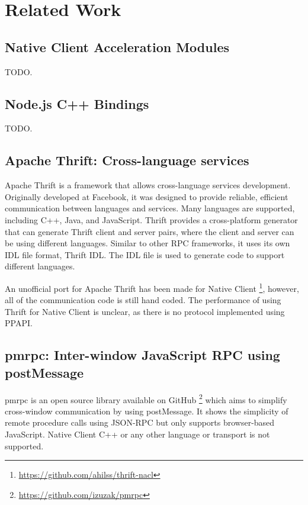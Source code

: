 \chapter{Related Work} 
\label{Chapter3} 

\section{Native Client Acceleration Modules} %
\label{sec:naclam}
TODO.

\section{Node.js C++ Bindings} %
\label{sec:node_js_c_bindings}
TODO.



\section{Apache Thrift: Cross-language services} %
\label{sec:apache_thrift_cross_language_services}
Apache Thrift is a framework that allows cross-language services development. Originally developed at Facebook, it was designed to provide reliable, efficient communication between languages and services. Many languages are supported, including C++, Java, and JavaScript. Thrift provides a cross-platform generator that can generate Thrift client and server pairs, where the client and server can be using different languages. Similar to other RPC frameworks, it uses its own IDL file format, Thrift IDL. The IDL file is used to generate code to support different languages.

An unofficial port for Apache Thrift has been made for Native Client \footnote{\url{https://github.com/ahilss/thrift-nacl}}, however, all of the communication code is still hand coded. The performance of using Thrift for Native Client is unclear, as there is no protocol implemented using PPAPI.


\section{pmrpc: Inter-window JavaScript RPC using postMessage} %
\label{sec:pmrpc_json_rpc_using_postmessage}
pmrpc is an open source library available on GitHub \footnote{\url{https://github.com/izuzak/pmrpc}} which aims to simplify cross-window communication by using postMessage. It shows the simplicity of remote procedure calls using JSON-RPC but only supports browser-based JavaScript. Native Client C++ or any other language or transport is not supported.

